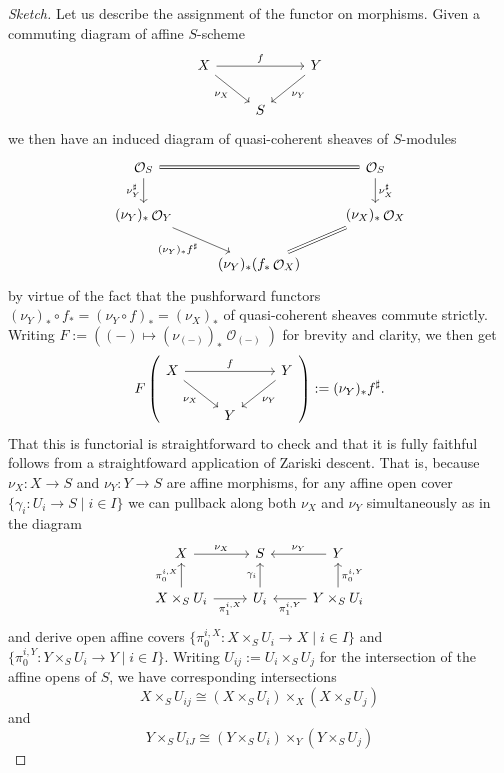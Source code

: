 \documentclass{amsart}
\theoremstyle{definition}
\DeclareMathOperator{\Ocal}{\mathcal{O}}
\numberwithin{equation}{subsection}
\begin{document}
\begin{proof}[Sketch]
Let us describe the assignment of the functor on morphisms. Given a commuting diagram of affine $S$-scheme
\[
\begin{tikzcd}
X \ar[rr]{}{f} \ar[dr, swap]{}{\nu_X} & & Y \ar[dl]{}{\nu_Y} \\
 & S
\end{tikzcd}
\]
we then have an induced diagram of quasi-coherent sheaves of $S$-modules
\[
\begin{tikzcd}
\Ocal_{S} \ar[d, swap]{}{\nu_Y^{\sharp}} \ar[rr, equals]  & & \Ocal_S \ar[d]{}{\nu_X^{\sharp}}  \\
(\nu_Y)_{\ast}\Ocal_Y \ar[dr, swap]{}{(\nu_Y)_{\ast}f^{\sharp}} & & (\nu_X)_{\ast}\Ocal_X \\
 & (\nu_{Y})_{\ast}(f_{\ast}\Ocal_X) \ar[ur, equals]
\end{tikzcd}
\]
by virtue of the fact that the pushforward functors $(\nu_Y)_{\ast} \circ f_{\ast} = (\nu_Y \circ f)_{\ast} = (\nu_X)_{\ast}$ of quasi-coherent sheaves commute strictly. Writing $F := ((-) \mapsto (\nu_{(-)})_{\ast}\Ocal_{(-)})$ for brevity and clarity, we then get
\[
F\left(\begin{tikzcd}
X \ar[rr]{}{f} \ar[dr, swap]{}{\nu_X} & & Y \ar[dl]{}{\nu_Y}  \\
 & Y
\end{tikzcd}\right) := (\nu_Y)_{\ast}f^{\sharp}.
\]
That this is functorial is straightforward to check and that it is fully faithful follows from a straightfoward application of Zariski descent. That is, because $\nu_X:X \to S$ and $\nu_Y:Y \to S$ are affine morphisms, for any affine open cover $\lbrace \gamma_i:U_i \to S \; | \; i \in I \rbrace$ we can pullback along both $\nu_X$ and $\nu_Y$ simultaneously as in the diagram
\[
\begin{tikzcd}
X \ar[r]{}{\nu_X} & S & Y \ar[l, swap]{}{\nu_Y} \\
X \times_S U_i \ar[u]{}{\pi_0^{i,X}} \ar[r, swap]{}{\pi_1^{i,X}} & U_i \ar[u]{}{\gamma_i} & Y \times_S U_i \ar[l]{}{\pi_1^{i,Y}} \ar[u, swap]{}{\pi_0^{i,Y}}
\end{tikzcd}
\]
and derive open affine covers $\lbrace \pi_0^{i,X}:X \times_S U_i \to X \; | \; i \in I \rbrace$ and $\lbrace \pi_0^{i,Y}:Y \times_S U_i \to Y \; | \; i \in I \rbrace$. Writing $U_{ij} := U_i \times_S U_j$ for the intersection of the affine opens of $S$, we have corresponding intersections
\[
X \times_S U_{ij} \cong (X \times_S U_i) \times_X (X \times_S U_j)
\]
and
\[
Y \times_S U_{iJ} \cong (Y \times_S U_i) \times_Y (Y \times_S U_j)
\]
\end{proof}
\end{document}
